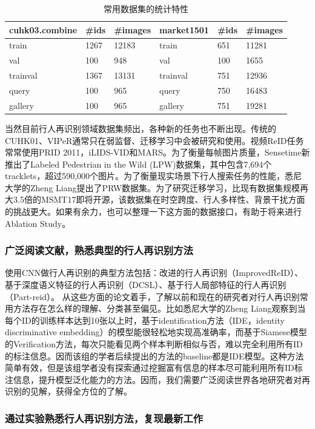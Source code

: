 \begin{table}[!htbp]
\centering
\caption{常用数据集的统计特性}
\label{table:dataset}
\begin{tabular}{|l||l|l||l||l|l|}
\hline
cuhk03.combine & \#ids & \#images & market1501 & \#ids & \#images \\ \hline \hline
train & 1267 & 12183 & train &651&11281\\ \hline 
val&100&948&val&100&1655\\ \hline 
trainval&1367&13131&trainval&751&12936\\ \hline 
query&100&965&query&750&16483\\ \hline 
gallery&100&965&gallery&751&19281 \\ \hline
\end{tabular}
\end{table}

当然目前行人再识别领域数据集频出，各种新的任务也不断出现。传统的CUHK01、VIPeR通常只在弱监督、迁移学习中会被研究和使用。视频ReID任务常常使用PRID 2011，iLIDS-VID和MARS。为了衡量每帧图片质量，Sensetime新推出了Labeled Pedestrian in the Wild (LPW)数据集，其中包含7,694个tracklets，超过590,000个图片。为了衡量现实场景下行人搜索任务的性能，悉尼大学的Zheng Liang提出了PRW数据集。为了研究迁移学习，比现有数据集规模再大3.5倍的MSMT17即将开源，该数据集在时空跨度、行人多样性、背景干扰方面的挑战更大。如果有余力，也可以整理一下这方面的数据接口，有助于将来进行Ablation Study。

\subsubsection{广泛阅读文献，熟悉典型的行人再识别方法}

使用CNN做行人再识别的典型方法包括：改进的行人再识别（ImprovedReID）、基于深度语义特征的行人再识别（DCSL）、基于行人局部特征的行人再识别（Part-reid）。
从这些方面的论文着手，了解以前和现在的研究者对行人再识别常用方法存在怎么样的理解、分类甚至偏见。比如悉尼大学的Zheng Liang观察到当每个ID的训练样本达到10张以上时，基于identification方法（IDE，identity discriminative embedding）的模型能很轻松地实现高准确率，而基于Siamese模型的Verification方法，每次只能看见两个样本判断相似与否，难以完全利用所有ID的标注信息。因而该组的学者后续提出的方法的baseline都是IDE模型。这种方法简单有效，但是该组学者没有探索通过挖掘富有信息的样本尽可能利用所有ID标注信息，提升模型泛化能力的方法。因而，我们需要广泛阅读世界各地研究者对再识别的见解，获得全方位的了解。

\subsubsection{通过实验熟悉行人再识别方法，复现最新工作}

